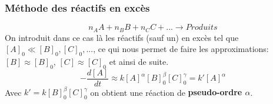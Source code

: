 \documentclass[10pt,a4paper]{book}
\begin{document}
\subsubsection{Méthode des réactifs en excès}
\[n_AA + n_BB + n_CC + ... \longrightarrow Produits\]
On introduit dans ce cas là les réactifs (sauf un) en excès tel que \([A]_0 \ll [B]_0, [C]_0, ...\), ce qui nous permet de faire les approximations: \([B] \approx [B]_0\), \([C] \approx [C]_0\) et ainsi de suite.
\[-\frac{d[A]}{dt} \approx k[A]^{\alpha}[B]^{\beta}_0[C]^{\gamma}_0 = k'[A]^{\alpha}\]
Avec \(k' = k[B]^{\beta}_0[C]^{\gamma}_0\) on obtient une réaction de \textbf{pseudo-ordre $\alpha$}.
\end{document}
